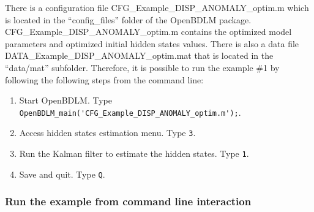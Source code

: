 There is a configuration file CFG\_Example\_DISP\_ANOMALY\_optim.m which is located in the ``config\_files'' folder of the OpenBDLM package.
CFG\_Example\_DISP\_ANOMALY\_optim.m contains the optimized model parameters and optimized initial hidden states values.
There is also a data file DATA\_Example\_DISP\_ANOMALY\_optim.mat that is located in the ``data/mat'' subfolder.
Therefore, it is possible to run the example \#1 by following the following steps from the \MATLAB{} command line:
\begin{enumerate}
\item Start OpenBDLM. Type \colorbox{light-gray}{\lstinline[basicstyle = \mlttfamily \small, backgroundcolor = \color{light-gray}]!OpenBDLM_main('CFG_Example_DISP_ANOMALY_optim.m');!}.
\item Access hidden states estimation menu. Type \colorbox{light-gray}{\lstinline[basicstyle = \mlttfamily \small, backgroundcolor = \color{light-gray}]!3!}.
\item Run the Kalman filter to estimate the hidden states. Type \colorbox{light-gray}{\lstinline[basicstyle = \mlttfamily \small, backgroundcolor = \color{light-gray}]!1!}.
\item Save and quit. Type \colorbox{light-gray}{\lstinline[basicstyle = \mlttfamily \small, backgroundcolor = \color{light-gray}]!Q!}.
\end{enumerate}


\subsubsection{Run the example from command line interaction}

